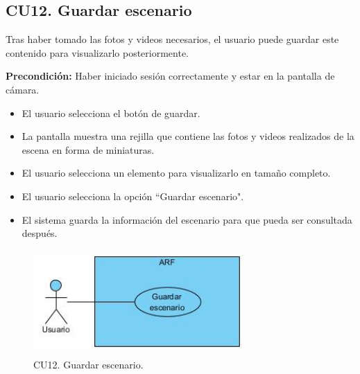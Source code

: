 \subsection{CU12. Guardar escenario}\par
Tras haber tomado las fotos y videos necesarios, el usuario puede guardar este contenido para visualizarlo posteriormente.\par
\textbf{Precondición:} Haber iniciado sesión correctamente y estar en la pantalla de cámara.\par
\begin{itemize}
	\item El usuario selecciona el botón de guardar.
	\item La pantalla muestra una rejilla que contiene las fotos y videos realizados de la escena en forma de miniaturas.
	\item El usuario selecciona un elemento para visualizarlo en tamaño completo.
	\item El usuario selecciona la opción ``Guardar escenario".
	\item El sistema guarda la información del escenario para que pueda ser consultada después.
\end{itemize} 

\begin{figure}[!htbp]
	\centering
	\includegraphics[width=8cm,height=4cm]{imagenes/analisis/cu/guardar_escenario.jpg}
	\caption{CU12. Guardar escenario.}
	\label{fig:guardarescenario}
\end{figure} 

